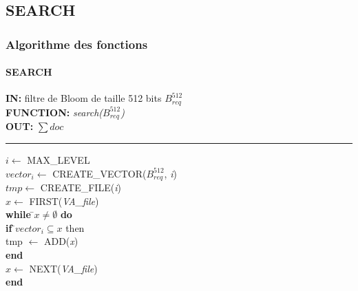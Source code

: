 \documentclass[hyperref={pdfpagemode=FullScreen,colorlinks=true},xcolor=pst,dvips]{beamer}\usepackage[french]{babel}
\begin{document}
	\subsection{SEARCH}
	\begin{frame}[shrink]
		\frametitle{Algorithme des fonctions}
		\framesubtitle{SEARCH}
		\begin{framed}
		\textbf{IN:} filtre de Bloom de taille 512 bits $B^{512}_{req}$\\
		\textbf{FUNCTION:} \textit{search($B^{512}_{req}$)}\\
		\textbf{OUT:} \textit{$\sum doc$}\\

		\noindent\rule{\linewidth}{0.5pt}

		\begin{tabbing}
			$i \leftarrow$ MAX\_LEVEL\\
			$vector_i \leftarrow$ CREATE\_VECTOR($B^{512}_{req}$, \textit{i})\\
			$tmp \leftarrow$ CREATE\_FILE(\textit{i})\\
			$x \leftarrow$ FIRST(\textit{VA\_file})\\
			
			\textbf{while }\=$x \neq \emptyset $ \textbf{do}\\
					\> \textbf{if }\=$vector_i \subseteq x$ {then}\\
						\>\> tmp $\leftarrow$ ADD(\textit{x})\\
					\> \textbf{end}\\
					\> $x \leftarrow$ NEXT(\textit{VA\_file})\\
			\textbf{end}
	    	\end{tabbing}		
	\end{framed}
	\end{frame}
	
\end{document}
